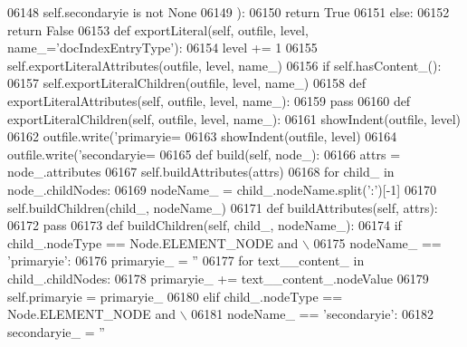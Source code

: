 \begin{DoxyCode}
{{{{{{{{{{{{{{{{{{{{{{{{{{{{{{{{{{{{{{{{{{{{{{{{{{{{{{{{{{{{{{{{{{{{{{{{{{{{{{{{{{{{{{{{{{{{{{{{{{{{{{{{{{{{{{{{{{{{{{{{{{{{{{{{{{{{{{{{{{{{{{{{{{{{{{{{{{{{{{{{{{{{{{{{{{{{{{{{{{{{{{{{{{{{{{{{{{{{{{{{{{{{{{{{{{{{{{{{{{{{{{{{{{{{{{{{{{{{{{{{{{{{{{{{{{{{{{{{{{{{{{{{{{{{{{{{{{{{{{{{{{{{{{{{{{{{{{{{{{{{{{{{{{{{{{{{{{{{{{{{{{{{{{{{{{{{{{{{{{{{{{{{{{{{{{{{{{{{{{{{{{{{{{{{{{{{{{{{{{{{{{{{{{06148             self.secondaryie \textcolor{keywordflow}{is} \textcolor{keywordflow}{not} \textcolor{keywordtype}{None}
06149             ):
06150             \textcolor{keywordflow}{return} \textcolor{keyword}{True}
06151         \textcolor{keywordflow}{else}:
06152             \textcolor{keywordflow}{return} \textcolor{keyword}{False}
06153     \textcolor{keyword}{def }exportLiteral(self, outfile, level, name\_='docIndexEntryType'):
06154         level += 1
06155         self.exportLiteralAttributes(outfile, level, name\_)
06156         \textcolor{keywordflow}{if} self.hasContent_():
06157             self.exportLiteralChildren(outfile, level, name\_)
06158     \textcolor{keyword}{def }exportLiteralAttributes(self, outfile, level, name\_):
06159         \textcolor{keywordflow}{pass}
06160     \textcolor{keyword}{def }exportLiteralChildren(self, outfile, level, name\_):
06161         showIndent(outfile, level)
06162         outfile.write(\textcolor{stringliteral}{'primaryie=%
06163         showIndent(outfile, level)
06164         outfile.write(\textcolor{stringliteral}{'secondaryie=%
06165     \textcolor{keyword}{def }build(self, node\_):
06166         attrs = node\_.attributes
06167         self.buildAttributes(attrs)
06168         \textcolor{keywordflow}{for} child\_ \textcolor{keywordflow}{in} node\_.childNodes:
06169             nodeName\_ = child\_.nodeName.split(\textcolor{stringliteral}{':'})[-1]
06170             self.buildChildren(child\_, nodeName\_)
06171     \textcolor{keyword}{def }buildAttributes(self, attrs):
06172         \textcolor{keywordflow}{pass}
06173     \textcolor{keyword}{def }buildChildren(self, child\_, nodeName\_):
06174         \textcolor{keywordflow}{if} child\_.nodeType == Node.ELEMENT\_NODE \textcolor{keywordflow}{and} \(\backslash\)
06175             nodeName\_ == \textcolor{stringliteral}{'primaryie'}:
06176             primaryie\_ = \textcolor{stringliteral}{''}
06177             \textcolor{keywordflow}{for} text\_\_content\_ \textcolor{keywordflow}{in} child\_.childNodes:
06178                 primaryie\_ += text\_\_content\_.nodeValue
06179             self.primaryie = primaryie\_
06180         \textcolor{keywordflow}{elif} child\_.nodeType == Node.ELEMENT\_NODE \textcolor{keywordflow}{and} \(\backslash\)
06181             nodeName\_ == \textcolor{stringliteral}{'secondaryie'}:
06182             secondaryie\_ = \textcolor{stringliteral}{''}
}}}}}}}}}}}}}}}}}}}}}}}}}}}}}}}}}}}}}}}}}}}}}}}}}}}}}}}}}}}}}}}}}}}}}}}}}}}}}}}}}}}}}}}}}}}}}}}}}}}}}}}}}}}}}}}}}}}}}}}}}}}}}}}}}}}}}}}}}}}}}}}}}}}}}}}}}}}}}}}}}}}}}}}}}}}}}}}}}}}}}}}}}}}}}}}}}}}}}}}}}}}}}}}}}}}}}}}}}}}}}}}}}}}}}}}}}}}}}}}}}}}}}}}}}}}}}}}}}}}}}}}}}}}}}}}}}}}}}}}}}}}}}}}}}}}}}}}}}}}}}}}}}}}}}}}}}}}}}}}}}}}}}}}}}}}}}}}}}}}}}}}}}}}}}}}}}}}}}}}}}}}}}}}}}}}}}}}}}}}}}}}}}}}}
\end{DoxyCode}
